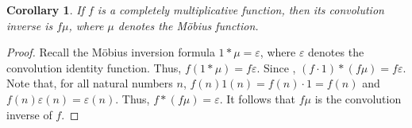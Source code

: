 \documentclass[12pt]{article}
\newtheorem{cor*}{Corollary}
\begin{document}

\begin{cor*}
If $f$ is a completely multiplicative function, then its convolution inverse is $f\mu$, where $\mu$ denotes the M\"{o}bius function.
\end{cor*}

\begin{proof}
Recall the M\"{o}bius inversion formula $1*\mu = \varepsilon$, where $\varepsilon$ denotes the convolution identity function.  Thus, $f(1*\mu) = f\varepsilon$.  Since , $(f \cdot 1)*(f\mu)=f\varepsilon$.  Note that, for all natural numbers $n$, $f(n)1(n)=f(n) \cdot 1=f(n)$ and $f(n)\varepsilon(n)=\varepsilon(n)$.  Thus, $f*(f \mu)=\varepsilon$.  It follows that $f\mu$ is the convolution inverse of $f$.
\end{proof}
\end{document}
